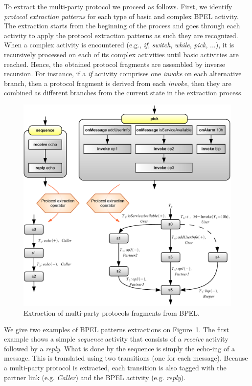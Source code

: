 To extract the multi-party protocol we proceed as follows.
First, we identify \emph{protocol extraction patterns} for each type of  basic and complex BPEL activity. The extraction starts from the beginning of the process and goes through each activity to apply the protocol extraction patterns as such they are recognized. When a complex activity is encountered (e.g., \emph{if}, \emph{switch}, \emph{while}, \emph{pick}, ...), it is recursively processed on each of its complex activities until basic activities are reached. Hence, the obtained protocol fragments are assembled by inverse recursion. For instance, if a \emph{if} activity comprises one \emph{invoke} on each alternative branch, then a protocol fragment is derived from each \emph{invoke}, then they are combined as different branches from the current state in the extraction process.\\

\begin{figure}[tbhp]
    \centering
    \includegraphics[width=\textwidth]{content/protocols-project/bpel2protocol}
    \caption{Extraction of multi-party protocols fragments from BPEL.}
    \label{fig:bpel2protocol}
\end{figure}

We give two examples of BPEL patterns extractions on Figure~\ref{fig:bpel2protocol}. The first example shows a simple \emph{sequence} activity that consists of a \emph{receive} activity followed by a \emph{reply}. What is done by the sequence is simply the echo-ing of a message. This is translated using two transitions (one for each message). Because a multi-party protocol is extracted, each transition is also tagged with the partner link (e.g. \emph{Caller}) and the BPEL activity (e.g. \emph{reply}).\\

